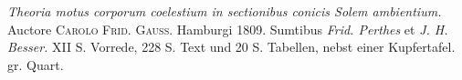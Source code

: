 \begingroup
\pagestyle{empty}
\vspace*{.367\textheight}
\noindent{}\par
\bigskip
{\fontsize{10}{12}\selectfont\textit{Theoria motus corporum coelestium in sectionibus conicis Solem ambientium.}}\newline
Auctore \textsc{Carolo Frid. Gauss.} Hamburgi 1809. Sumtibus \textit{Frid. Perthes} et \textit{J. H. Besser.} XII S. Vorrede, 228 S. Text und 20 S. Tabellen, nebst einer Kupfertafel. gr. Quart.


